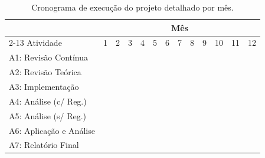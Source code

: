 \documentclass[12pt]{article}
\begin{document}
\begin{table}[H]
\centering
\begin{tabular}{l|cccccccccccc}
\hline
\hline
& \multicolumn{12}{c}{Mês} \\
\cline{2-13}
Atividade & 1 & 2 & 3 & 4 & 5 & 6 & 7 & 8 & 9 & 10 & 11 & 12 \\
\hline
A1: Revisão Contínua    & \X & \X & \X & \X & \X & \X & \X & \X & \X & \X & \X & \X \\
A2: Revisão Teórica     & \X & \X &    &    &    &    &    &    &    &    &    &    \\
A3: Implementação       &    &    & \X & \X & \X &    &    &    &    &    &    &    \\
A4: Análise (c/ Reg.)   &    &    &    &    &    & \X & \X & \X &    &    &    &    \\
A5: Análise (s/ Reg.)   &    &    &    &    &    &    &    &    & \X &    &    &    \\
A6: Aplicação e Análise &    &    &    &    &    &    &    &    &    & \X &    &    \\
A7: Relatório Final     &    &    &    &    &    &    &    &    &    &    & \X & \X \\
\hline \hline
\end{tabular}
\caption{Cronograma de execução do projeto detalhado por mês.}
\label{tab:cronograma_mensal}
\end{table}

\printbibliography
\end{document}
